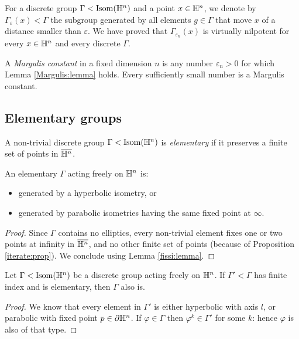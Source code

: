 For a discrete group $\Gamma < {\rm Isom}(\mathbb{H}^n)$ and a point $x\in \mathbb{H}^n$, we denote by $\Gamma_\varepsilon (x)< \Gamma$ the subgroup generated by all elements $g\in \Gamma$ that move $x$ of a distance smaller than $\varepsilon$. We have proved that $\Gamma_{\varepsilon_n} (x)$ is virtually nilpotent for every $x\in\mathbb{H}^n$ and every discrete $\Gamma$.

A \emph{Margulis constant} in a fixed dimension $n$ is any number $\varepsilon_n>0$ for which Lemma \ref{Margulis:lemma} holds. Every sufficiently small number is a Margulis constant. 

\subsection{Elementary groups}
A non-trivial discrete group $\Gamma < {\rm Isom}(\mathbb{H}^n)$ is \emph{elementary} if it preserves a finite set of points in $\overline{\mathbb{H}^n}$.

\begin{prop} \label{elementary:prop}
An elementary $\Gamma$ acting freely on $\mathbb{H}^n$ is:
\begin{itemize}
\item generated by a hyperbolic isometry, or
\item generated by parabolic isometries having the same fixed point at $\infty$.
\end{itemize}
\end{prop}
\begin{proof}
Since $\Gamma$ contains no elliptics, every non-trivial element fixes one or two points at infinity in $\overline{\mathbb{H}^n}$, and no other finite set of points (because of Proposition \ref{iterate:prop}). We conclude using Lemma \ref{fissi:lemma}.
\end{proof}

\begin{prop} \label{elementary:index:prop}
Let $\Gamma<{\rm Isom}(\mathbb{H}^n)$ be a discrete group acting freely on $\mathbb{H}^n$. If $\Gamma'<\Gamma$ has finite index and is elementary, then $\Gamma$ also is.
\end{prop}
\begin{proof}
We know that every element in $\Gamma'$ is either hyperbolic with axis $l$, or parabolic with fixed point $p\in\partial\mathbb{H}^n$. If $\varphi \in \Gamma$ then $\varphi^k\in \Gamma'$ for some $k$: hence $\varphi$ is also of that type.
\end{proof}

